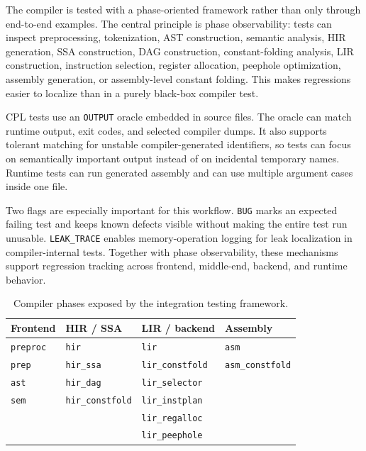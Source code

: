 \documentclass[10pt,twocolumn]{article}
\begin{document}
\par The compiler is tested with a phase-oriented framework rather than only through end-to-end examples. The central principle is phase observability: tests can inspect preprocessing, tokenization, AST construction, semantic analysis, HIR generation, SSA construction, DAG construction, constant-folding analysis, LIR construction, instruction selection, register allocation, peephole optimization, assembly generation, or assembly-level constant folding. This makes regressions easier to localize than in a purely black-box compiler test.
\par CPL tests use an \texttt{OUTPUT} oracle embedded in source files. The oracle can match runtime output, exit codes, and selected compiler dumps. It also supports tolerant matching for unstable compiler-generated identifiers, so tests can focus on semantically important output instead of on incidental temporary names. Runtime tests can run generated assembly and can use multiple argument cases inside one file.
\par Two flags are especially important for this workflow. \texttt{BUG} marks an expected failing test and keeps known defects visible without making the entire test run unusable. \texttt{LEAK\_TRACE} enables memory-operation logging for leak localization in compiler-internal tests. Together with phase observability, these mechanisms support regression tracking across frontend, middle-end, backend, and runtime behavior.

\begin{table}[t]
\centering
\footnotesize
\caption{Compiler phases exposed by the integration testing framework.}
\label{tab:testing-modules}
\begin{tabular}{llll}
\toprule
Frontend & HIR / SSA & LIR / backend & Assembly \\
\midrule
\texttt{preproc} & \texttt{hir} & \texttt{lir} & \texttt{asm} \\
\texttt{prep} & \texttt{hir\_ssa} & \texttt{lir\_constfold} & \texttt{asm\_constfold} \\
\texttt{ast} & \texttt{hir\_dag} & \texttt{lir\_selector} &  \\
\texttt{sem} & \texttt{hir\_constfold} & \texttt{lir\_instplan} &  \\
 &  & \texttt{lir\_regalloc} &  \\
 &  & \texttt{lir\_peephole} &  \\
\bottomrule
\end{tabular}
\end{table}
\end{document}
